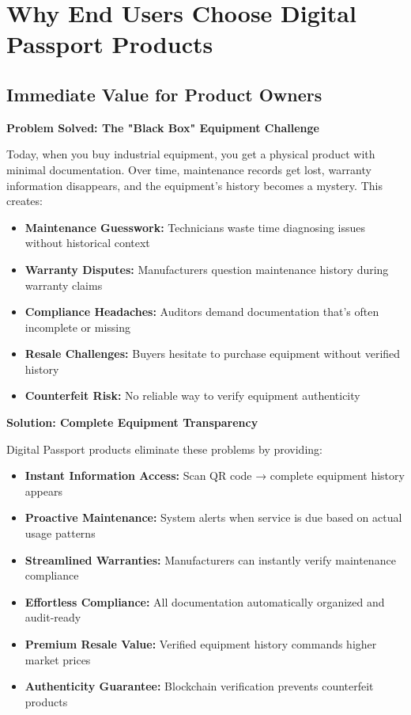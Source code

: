 \documentclass[11pt,a4paper]{article}
\begin{document}
\section{Why End Users Choose Digital Passport Products}

\subsection{Immediate Value for Product Owners}

\textbf{Problem Solved: The "Black Box" Equipment Challenge}

Today, when you buy industrial equipment, you get a physical product with minimal documentation. Over time, maintenance records get lost, warranty information disappears, and the equipment's history becomes a mystery. This creates:

\begin{itemize}[leftmargin=0.5cm]
    \item \textbf{Maintenance Guesswork:} Technicians waste time diagnosing issues without historical context
    \item \textbf{Warranty Disputes:} Manufacturers question maintenance history during warranty claims  
    \item \textbf{Compliance Headaches:} Auditors demand documentation that's often incomplete or missing
    \item \textbf{Resale Challenges:} Buyers hesitate to purchase equipment without verified history
    \item \textbf{Counterfeit Risk:} No reliable way to verify equipment authenticity
\end{itemize}

\textbf{Solution: Complete Equipment Transparency}

Digital Passport products eliminate these problems by providing:

\begin{itemize}[leftmargin=0.5cm]
    \item \textbf{Instant Information Access:} Scan QR code → complete equipment history appears
    \item \textbf{Proactive Maintenance:} System alerts when service is due based on actual usage patterns
    \item \textbf{Streamlined Warranties:} Manufacturers can instantly verify maintenance compliance
    \item \textbf{Effortless Compliance:} All documentation automatically organized and audit-ready
    \item \textbf{Premium Resale Value:} Verified equipment history commands higher market prices
    \item \textbf{Authenticity Guarantee:} Blockchain verification prevents counterfeit products
\end{itemize}
\end{document}
